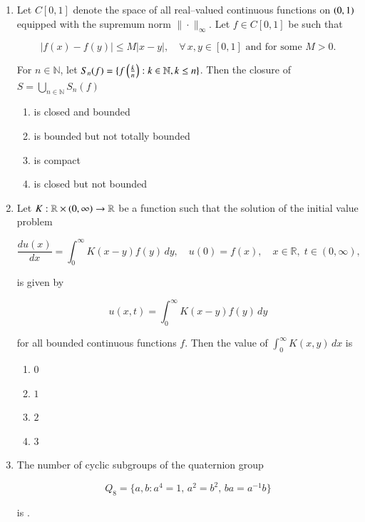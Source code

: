\documentclass[journal,12pt,onecolumn]{IEEEtran}
\theoremstyle{remark}
\begin{document}
\begin{enumerate}[start=1, label=Q.\arabic*]
\hfill{}

\item Let $C[0,1]$ denote the space of all real–valued continuous functions on $\left(0,1\right)$ equipped with the supremum norm $\|\cdot\|_\infty$. Let $f \in C[0,1]$ be such that  

\[
|f(x) - f(y)| \leq M |x-y|, \quad \forall \, x,y \in [0,1] \text{ and for some } M > 0.
\]

For $n \in \mathbb{N}$, let $S_n(f) = \{ f\left(\tfrac{k}{n}\right) : k \in \mathbb{N}, k \leq n \}$. Then the closure of $S = \bigcup_{n \in \mathbb{N}} S_n(f)$  

\begin{enumerate}
\item is closed and bounded  
\item is bounded but not totally bounded  
\item is compact  
\item is closed but not bounded  
\end{enumerate}

\hfill{}

\item Let $K : \mathbb{R} \times \left(0,\infty\right) \to \mathbb{R}$ be a function such that the solution of the initial value problem  

\[
\frac{du(x)}{dx} = \int_0^\infty K(x-y) f(y) \, dy, \quad u(0) = f(x), \quad x \in \mathbb{R}, \; t \in (0,\infty),
\]

is given by  

\[
u(x,t) = \int_0^\infty K(x-y) f(y) \, dy
\]

for all bounded continuous functions $f$. Then the value of $\int_0^\infty K(x,y) \, dx$ is  

\begin{enumerate}
\item $0$  
\item $1$  
\item $2$  
\item $3$  
\end{enumerate}

\hfill{}

\item The number of cyclic subgroups of the quaternion group  

\[
Q_8 = \{ a,b : a^4 = 1, \, a^2 = b^2, \, ba = a^{-1}b \}
\]

is \underline{\hspace{2cm}}.  


\end{enumerate}
\end{document}
